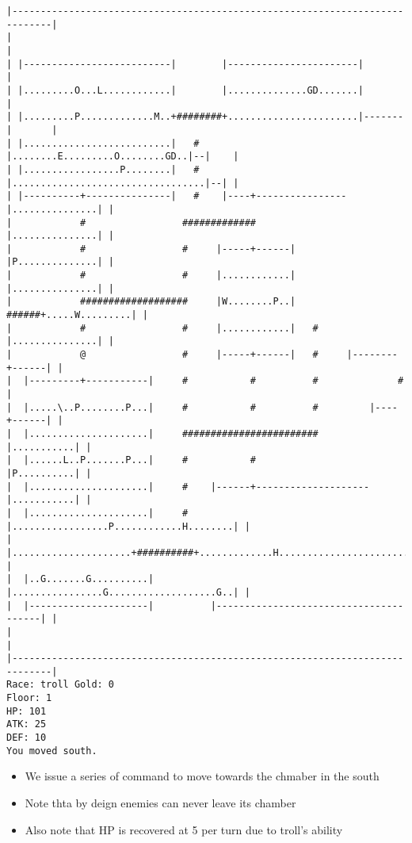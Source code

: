 \documentclass[11pt]{article}
\theoremstyle{plain}
\begin{document}
\begin{Verbatim}[fontsize=\small]
|-----------------------------------------------------------------------------|
|                                                                             |
| |--------------------------|        |-----------------------|               |
| |.........O...L............|        |..............GD.......|               |
| |.........P.............M..+########+.......................|-------|       |
| |..........................|   #    |........E.........O........GD..|--|    |
| |.................P........|   #    |..................................|--| |
| |----------+---------------|   #    |----+----------------|...............| |
|            #                 #############                |...............| |
|            #                 #     |-----+------|         |P..............| |
|            #                 #     |............|         |...............| |
|            ###################     |W........P..|   ######+.....W.........| |
|            #                 #     |............|   #     |...............| |
|            @                 #     |-----+------|   #     |--------+------| |
|  |---------+-----------|     #           #          #              #        |
|  |.....\..P........P...|     #           #          #         |----+------| |
|  |.....................|     ########################         |...........| |
|  |......L..P.......P...|     #           #                    |P..........| |
|  |.....................|     #    |------+--------------------|...........| |
|  |.....................|     #    |.................P............H........| |
|  |.....................+##########+.............H.........................| |
|  |..G.......G..........|          |................G...................G..| |
|  |---------------------|          |---------------------------------------| |
|                                                                             |
|-----------------------------------------------------------------------------|
Race: troll Gold: 0                                                    Floor: 1
HP: 101
ATK: 25
DEF: 10
You moved south.  
\end{Verbatim}

\begin{itemize}
    \item We issue a series of command to move towards the chmaber in the south
    \item Note thta by deign enemies can never leave its chamber
    \item Also note that HP is recovered at 5 per turn due to troll's ability
\end{itemize}
\end{document}
